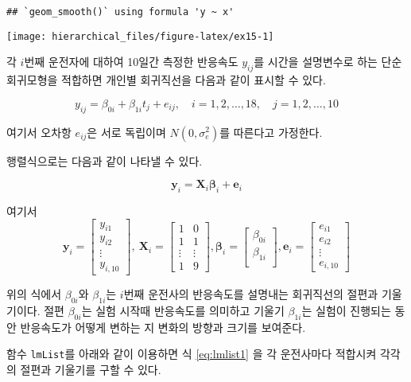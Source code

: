 \documentclass[
]{book}
\newcommand{\bm}[1]{ \symbf{#1}}
\begin{document}
\begin{verbatim}
## `geom_smooth()` using formula 'y ~ x'
\end{verbatim}

\texttt{[image: hierarchical\_files/figure-latex/ex15-1]}

각 \(i\)번째 운전자에 대하여 10일간 측정한 반응속도 \(y_{ij}\)를 시간을 설명변수로 하는 단순 회귀모형을 적합하면 개인별 회귀직선을 다음과 같이 표시할 수 있다.

\begin{equation}
y_{ij} = \beta_{0i} + \beta_{1i} t_j + e_{ij},\quad i=1,2,\dots,18,\quad j=1,2,\dots,10
\label{eq:lmlist1}
\end{equation}

여기서 오차항 \(e_{ij}\)은 서로 독립이며 \(N(0, \sigma^2_e)\)를 따른다고 가정한다.

행렬식으로는 다음과 같이 나타낼 수 있다.

\[  
\bm y_i =\bm X_i \bm \beta_{i} +\bm e_i 
\]

여기서
\[ 
\bm y_i=\begin{bmatrix}
y_{i1} \\
y_{i2} \\
\vdots \\
y_{i,10}
\end{bmatrix},~ \bm X_i =
\begin{bmatrix}
1 & 0 \\
1 & 1 \\
\vdots & \vdots  \\
1 & 9 
\end{bmatrix}, \bm \beta_i=
\begin{bmatrix}
\beta_{0i} \\
\beta_{1i} \\
\end{bmatrix}, \bm e_i= 
\begin{bmatrix}
e_{i1} \\
e_{i2} \\
\vdots \\
e_{i,10}
\end{bmatrix}
\]

위의 식에서 \(\beta_{0i}\)와 \(\beta_{1i}\)는 \(i\)번째 운전사의 반응속도를 설명내는 회귀직선의 절편과 기울기이다. 절편 \(\beta_{0i}\)는 실험 시작때 반응속도를 의미하고 기울기 \(\beta_{1i}\)는 실험이 진행되는 동안 반응속도가 어떻게 변하는 지 변화의 방향과 크기를 보여준다.

함수 \texttt{lmList}를 아래와 같이 이용하면 식 \eqref{eq:lmlist1} 을 각 운전사마다 적합시켜 각각의 절편과 기울기를 구할 수 있다.
\end{document}

